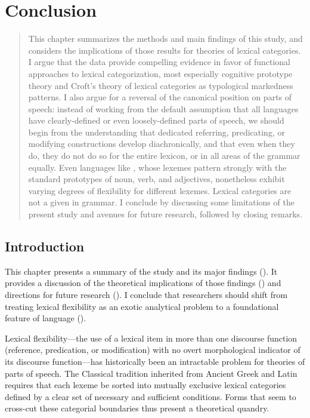 \chapter{Conclusion}
\label{ch:conclusion}

\blockquote{This chapter summarizes the methods and main findings of this study, and considers the implications of those results for theories of lexical categories. I argue that the data provide compelling evidence in favor of functional approaches to lexical categorization, most especially cognitive prototype theory and Croft's theory of lexical categories as typological markedness patterns. I also argue for a reversal of the canonical position on parts of speech: instead of working from the default assumption that all languages have clearly-defined or even loosely-defined parts of speech, we should begin from the understanding that dedicated referring, predicating, or modifying constructions develop diachronically, and that even when they do, they do not do so for the entire lexicon, or in all areas of the grammar equally. Even languages like , whose lexemes pattern strongly with the standard prototypes of noun, verb, and adjectives, nonetheless exhibit varying degrees of flexibility for different lexemes. Lexical categories are not a given in grammar. I conclude by discussing some limitations of the present study and avenues for future research, followed by closing remarks.}

\section{Introduction}
\label{sec:5.1}

This chapter presents a summary of the study and its major findings (). It provides a discussion of the theoretical implications of those findings () and directions for future research (). I conclude that researchers should shift from treating lexical flexibility as an exotic analytical problem to a foundational feature of language ().

Lexical flexibility—the use of a lexical item in more than one discourse function (reference, predication, or modification) with no overt morphological indicator of its discourse function—has historically been an intractable problem for theories of parts of speech. The Classical tradition inherited from Ancient Greek and Latin requires that each lexeme be sorted into mutually exclusive lexical categories defined by a clear set of necessary and sufficient conditions. Forms that seem to cross-cut these categorial boundaries thus present a theoretical quandry.


